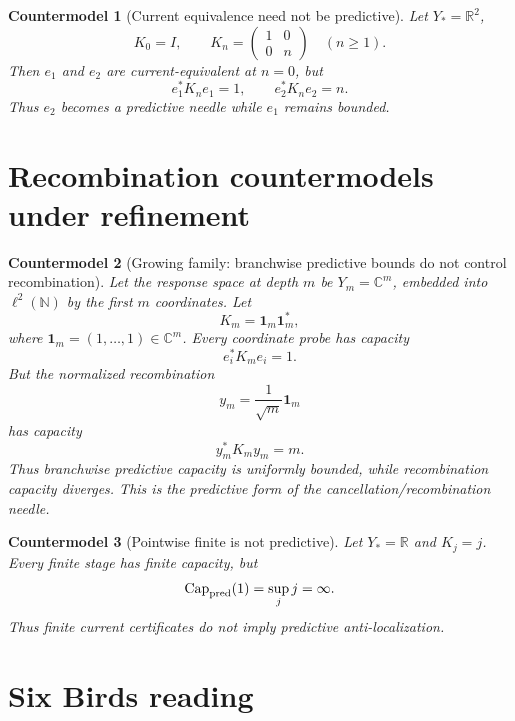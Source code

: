 \documentclass[11pt]{article}
\newtheorem{countermodel}{Countermodel}
\newcommand{\Capa}{\operatorname{Cap}}
\begin{document}
\begin{countermodel}[Current equivalence need not be predictive]
Let \(Y_*=\mathbb R^2\),
\[
K_0=I,
\qquad
K_n=\begin{pmatrix}1&0\\0&n\end{pmatrix}\quad(n\ge1).
\]
Then \(e_1\) and \(e_2\) are current-equivalent at \(n=0\), but
\[
e_1^*K_ne_1=1,
\qquad e_2^*K_ne_2=n.
\]
Thus \(e_2\) becomes a predictive needle while \(e_1\) remains bounded.
\end{countermodel}

\section{Recombination countermodels under refinement}

\begin{countermodel}[Growing family: branchwise predictive bounds do not control recombination]
Let the response space at depth \(m\) be \(Y_m=\mathbb C^m\), embedded into \(\ell^2(\mathbb N)\) by the first \(m\) coordinates. Let
\[
K_m=\mathbf 1_m\mathbf 1_m^*,
\]
where \(\mathbf 1_m=(1,\dots,1)\in\mathbb C^m\). Every coordinate probe has capacity
\[
e_i^*K_me_i=1.
\]
But the normalized recombination
\[
y_m=\frac{1}{\sqrt m}\mathbf 1_m
\]
has capacity
\[
y_m^*K_my_m=m.
\]
Thus branchwise predictive capacity is uniformly bounded, while recombination capacity diverges. This is the predictive form of the cancellation/recombination needle.
\end{countermodel}

\begin{countermodel}[Pointwise finite is not predictive]
Let \(Y_*=\mathbb R\) and \(K_j=j\). Every finite stage has finite capacity, but
\[
\Capa_{\rm pred}(1)=\sup_j j=\infty.
\]
Thus finite current certificates do not imply predictive anti-localization.
\end{countermodel}

\section{Six Birds reading}
\end{document}
